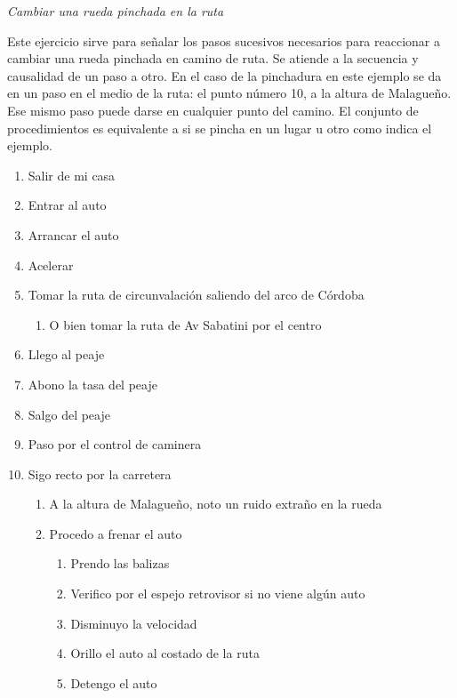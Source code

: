 \documentclass[]{article}
\date{}
\begin{document}
\emph{\emph{Cambiar una rueda pinchada en la ruta}}

Este ejercicio sirve para señalar los pasos sucesivos necesarios para reaccionar a cambiar una rueda pinchada en camino de ruta.
Se atiende a la secuencia y causalidad de un paso a otro. En el caso de la pinchadura en este ejemplo se da en un paso en el medio de la ruta: el punto número 10, a la altura de Malagueño. 
Ese mismo paso puede darse en cualquier punto del camino. 
El conjunto de procedimientos es equivalente a si se pincha en un lugar u otro
como indica el ejemplo.

\begin{enumerate}
\def\labelenumi{\arabic{enumi}.}
\item Salir de mi casa
\item Entrar al auto
\item Arrancar el auto
\item Acelerar
\item Tomar la ruta de circunvalación saliendo del arco de Córdoba %
    \begin{enumerate}
    \def\labelenumi{\arabic{enumi}.}
    \item O bien tomar la ruta de Av Sabatini por el centro
    \end{enumerate}

\item Llego al peaje
\item Abono la tasa del peaje
\item Salgo del peaje
\item Paso por el control de caminera
\item Sigo recto por la carretera
%
      \begin{enumerate}
      \item A la altura de Malagueño, noto un ruido extraño en la rueda %
      \item Procedo a frenar el auto
    \begin{enumerate}
    \def\labelenumi{\arabic{enumi}.}
    \item Prendo las balizas
    \item Verifico por el espejo retrovisor si no viene algún auto
    \item Disminuyo la velocidad
    \item Orillo el auto al costado de la ruta
    \item Detengo el auto
    \end{enumerate}


\end{enumerate}
\end{enumerate}
\end{document}
